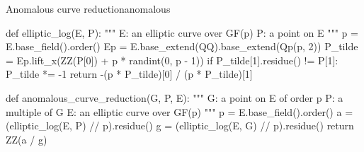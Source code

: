 \begin{alg}{Anomalous curve reduction}{anomalous}
\begin{sagecode}
def elliptic_log(E, P):
    """
    E: an elliptic curve over GF(p)
    P: a point on E
    """
    p = E.base_field().order()
    Ep = E.base_extend(QQ).base_extend(Qp(p, 2))
    P_tilde = Ep.lift_x(ZZ(P[0]) + p * randint(0, p - 1))
    if P_tilde[1].residue() != P[1]:
        P_tilde *= -1
    return -(p * P_tilde)[0] / (p * P_tilde)[1]

def anomalous_curve_reduction(G, P, E):
    """
    G: a point on E of order p
    P: a multiple of G
    E: an elliptic curve over GF(p)
    """
    p = E.base_field().order()
    a = (elliptic_log(E, P) // p).residue()
    g = (elliptic_log(E, G) // p).residue()
    return ZZ(a / g)
\end{sagecode}
\end{alg}
